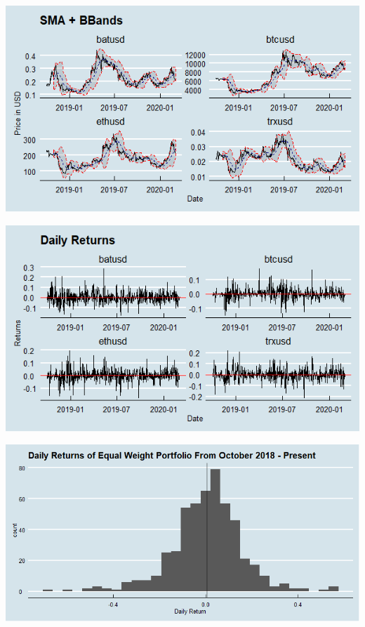 \documentclass{article}
\begin{document}
\begin{center}
    \includegraphics[scale = 0.75]{crypto_bband_graph.png}
\end{center}
\vspace{1 cm}

\begin{center}
    \includegraphics[scale = 0.75]{crypto_return_graph.png}
\end{center}

\begin{center}
    \includegraphics[scale = 0.6]{crypto_histogram.png}
\end{center}
\end{document}
